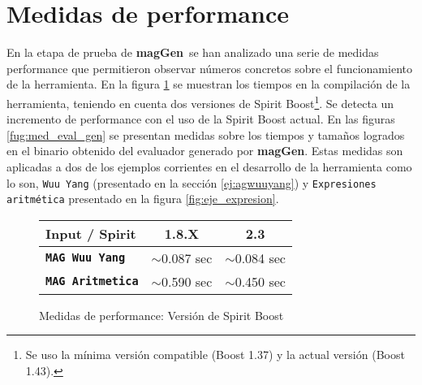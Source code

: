 \documentclass[runningheads,a4paper]{llncs}
\newcommand{\textbtt}[1]{\texttt{\textbf{#1}}}
\newcommand{\maggen}{\textbf{magGen}}
\begin{document}
\section{Medidas de performance}
\vspace{-0.2cm}
En la etapa de prueba de \maggen\ se han analizado una serie de medidas performance que permitieron observar números concretos sobre el funcionamiento de la herramienta. En la figura \ref{fig:version_boot} se muestran los tiempos en la compilación de la herramienta, teniendo en cuenta dos versiones de Spirit Boost\footnote{Se uso la mínima versión compatible (Boost 1.37) y la actual versión (Boost 1.43).}. Se detecta un incremento de performance con el uso de la Spirit Boost actual.
En las figuras \ref{fug:med_eval_gen} se presentan medidas sobre los tiempos y tamaños logrados en el binario obtenido del evaluador generado por \maggen. Estas medidas son aplicadas a dos de los ejemplos corrientes en el desarrollo de la herramienta como lo son,  \texttt{Wuu Yang} (presentado en la sección \ref{ej:agwuuyang}) y \texttt{Expresiones aritmética} presentado en la figura \ref{fig:eje_expresion}. 

\begin{figure}
    \vspace{-0.5cm}
    \begin{center}
        \setlength{\doublerulesep}{0mm}
        \setlength{\arrayrulewidth}{0.9pt}
        \begin{tabular}{|l||c|c|}
            \hline
            \rowcolor{gris} Input / Spirit           & \textbf{1.8.X}   & \textbf{2.3}   \\ \hline
            \rowcolor{white}\textbtt{MAG Wuu Yang}   & $\sim$0.087 sec & $\sim$0.084 sec \\ \hline
            \rowcolor{white}\textbtt{MAG Aritmetica} & $\sim$0.590 sec & $\sim$0.450 sec \\ \hline
        \end{tabular}
    \end{center}
    \vspace{-0,5cm}
    \caption{\label{fig:version_boot}Medidas de performance: Versión de Spirit Boost}
\end{figure}
\end{document}
